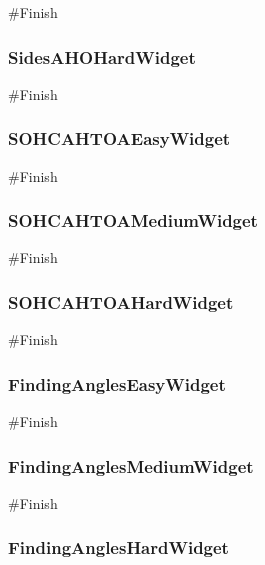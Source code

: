 \begin{landscape}
\begin{python}
#Finish
\end{python}

\subsubsection{SidesAHOHardWidget}

\begin{python}
#Finish
\end{python}

\subsubsection{SOHCAHTOAEasyWidget}

\begin{python}
#Finish
\end{python}

\subsubsection{SOHCAHTOAMediumWidget}

\begin{python}
#Finish
\end{python}

\subsubsection{SOHCAHTOAHardWidget}

\begin{python}
#Finish
\end{python}

\subsubsection{FindingAnglesEasyWidget}

\begin{python}
#Finish
\end{python}

\subsubsection{FindingAnglesMediumWidget}

\begin{python}
#Finish
\end{python}

\subsubsection{FindingAnglesHardWidget}


\end{landscape}
